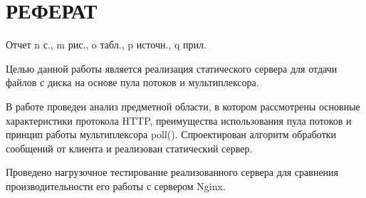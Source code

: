 \chapter*{РЕФЕРАТ}
Отчет n с., m рис., o табл., p источн., q прил. 

Целью данной работы является реализация статического сервера для отдачи файлов 
с диска на основе пула потоков и мультиплексора. 

В работе проведен анализ предметной области, в котором рассмотрены
основные характеристики протокола HTTP, преимущества использования пула потоков
и принцип работы мультиплексора poll(). Спроектирован алгоритм обработки 
сообщений от клиента и реализован статический сервер. 

Проведено нагрузочное тестирование реализованного сервера для сравнения 
производительности его работы с сервером Nginx.

